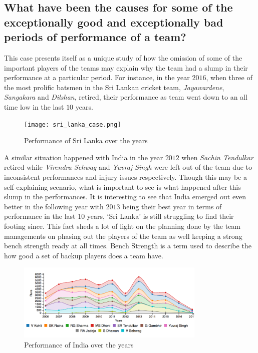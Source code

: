 \documentclass[10pt,journal,compsoc]{IEEEtran}
\begin{document}
\subsection{What have been the causes for some of the exceptionally good and exceptionally bad periods of performance of a team?}
This case presents itself as a unique study of how the omission of some of the important players of the teams may explain why the team had a slump in their performance at a particular period. For instance, in the year $2016$, when three of the most prolific batsmen in the Sri Lankan cricket team, \textit{Jayawardene}, \textit{Sangakara} and \textit{Dilshan}, retired, their performance as team went down to an all time low in the last $10$ years.

\begin{figure}[ht]
\texttt{[image: sri\_lanka\_case.png]}
\caption{Performance of Sri Lanka over the years}
\label{fig:sri_lanka_case}
\end{figure}

A similar situation happened with India in the year $2012$ when \textit{Sachin Tendulkar} retired while \textit{Virendra Sehwag} and \textit{Yuvraj Singh} were left out of the team due to inconsistent performances and injury issues respectively. \indent Though this may be a self-explaining scenario, what is important to see is what happened after this slump in the performances. It is interesting to see that India emerged out even better in the following year with $2013$ being their best year in terms of performance in the last $10$ years, `Sri Lanka' is still struggling to find their footing since. This fact sheds a lot of light on the planning done by the team managements on phasing out the players of the team as well keeping a strong bench strength ready at all times. Bench Strength is a term used to describe the how good a set of backup players does a team have.

\begin{figure}[ht]
\includegraphics[width=9cm]{india_case.png}
\caption{Performance of India over the years}
\label{fig:india_case}
\end{figure}
\end{document}
